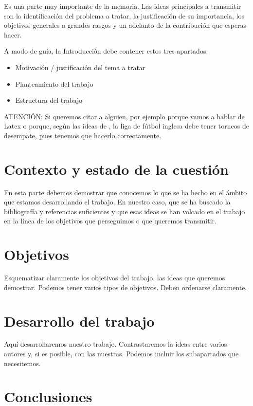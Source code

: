\documentclass[11pt,a4paper,spanish]{book}
\begin{document}
Es una parte muy importante de la memoria. Las ideas principales a transmitir son la identificación del problema a tratar, la justificación de su importancia, los objetivos generales a grandes rasgos y un adelanto de la contribución que esperas hacer.

A modo de guía, la Introducción debe contener estos tres apartados:
\begin{itemize}
\item Motivación / justificación del tema a tratar
\item Planteamiento del trabajo
\item Estructura del trabajo
\end{itemize}


ATENCIÓN:  Si queremos citar a alguien, por ejemplo porque vamos a hablar de Latex \citep{lamport1994} o porque, según las ideas de \cite{ackerman2017}, la liga de fútbol inglesa debe tener torneos de desempate, pues tenemos que hacerlo correctamente.



\chapter{Contexto y estado de la cuestión}

En esta parte debemos demostrar que conocemos lo que se ha hecho en el ámbito que estamos desarrollando el trabajo. En nuestro caso, que se ha buscado la bibliografía y referencias suficientes y que esas ideas se han volcado en el trabajo en la línea de los objetivos que perseguimos o que queremos transmitir.


\chapter{Objetivos}

Esquematizar claramente los objetivos del trabajo, las ideas que queremos demostrar. Podemos tener varios tipos de objetivos. Deben ordenarse claramente.

\chapter{Desarrollo del trabajo}

Aquí desarrollaremos nuestro trabajo. Contrastaremos la ideas entre varios autores y, si es posible, con las nuestras. Podemos incluir los subapartados que necesitemos.

\chapter{Conclusiones}
\end{document}
